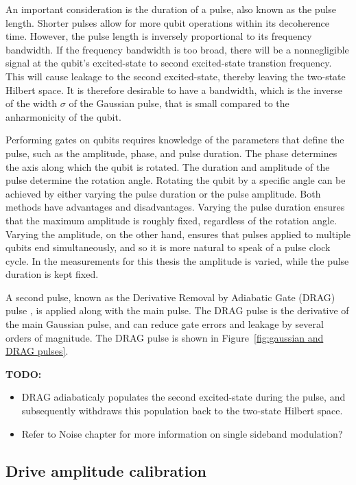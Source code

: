         An important consideration is the duration of a pulse, also known as the pulse length. Shorter pulses allow for more qubit operations within its decoherence time. However, the pulse length is inversely proportional to its frequency bandwidth. If the frequency bandwidth is too broad, there will be a nonnegligible signal at the qubit's excited-state to second excited-state transtion frequency. This will cause leakage to the second excited-state, thereby leaving the two-state Hilbert space. It is therefore desirable to have a bandwidth, which is the inverse of the width $\sigma$ of the Gaussian pulse, that is small compared to the anharmonicity of the qubit.

        Performing gates on qubits requires knowledge of the parameters that define the pulse, such as the amplitude, phase, and pulse duration. The phase determines the axis along which the qubit is rotated. The duration and amplitude of the pulse determine the rotation angle. Rotating the qubit by a specific angle can be achieved by either varying the pulse duration or the pulse amplitude. Both methods have advantages and disadvantages. Varying the pulse duration ensures that the maximum amplitude is roughly fixed, regardless of the rotation angle. Varying the amplitude, on the other hand, ensures that pulses applied to multiple qubits end simultaneously, and so it is more natural to speak of a pulse clock cycle. In the measurements for this thesis the amplitude is varied, while the pulse duration is kept fixed.

        A second pulse, known as the Derivative Removal by Adiabatic Gate (DRAG) pulse \cite{motzoi2009simple}, is applied along with the main pulse. The DRAG pulse is the derivative of the main Gaussian pulse, and can reduce gate errors and leakage by several orders of magnitude. The DRAG pulse is shown in Figure~\ref{fig:gaussian and DRAG pulses}.

        \textbf{TODO:}
        \begin{itemize}
          \item DRAG adiabaticaly populates the second excited-state during the pulse, and subsequently withdraws this population back to the two-state Hilbert space.
          \item Refer to Noise chapter for more information on single sideband modulation?
        \end{itemize}

      \subsection{Drive amplitude calibration}
        \label{ssec:Rabi}

